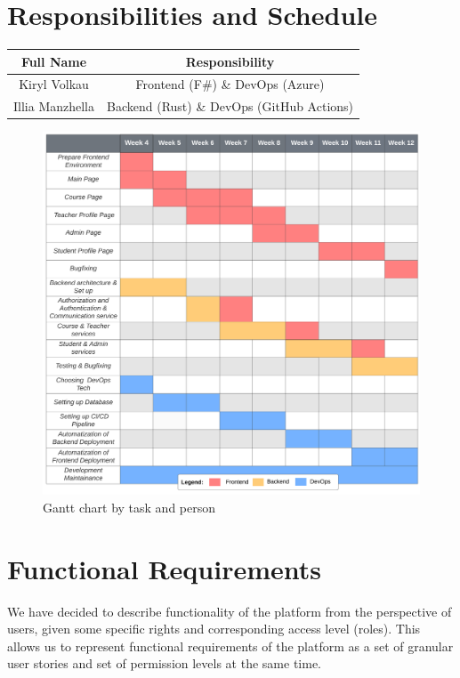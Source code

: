 \documentclass[a4paper,11pt,twoside]{report}
\theoremstyle{definition}
\begin{document}
\chapter*{Responsibilities and Schedule}
\begin{center}
\begin{tabular}{ |c|c| } 
 \hline
 Full Name & Responsibility \\ 
 \hline
 Kiryl Volkau & Frontend (F\#) \& DevOps (Azure) \\ 
 Illia Manzhella & Backend (Rust) \& DevOps (GitHub Actions) \\ 
 \hline
\end{tabular}
\begin{figure}[h]
    \includegraphics[scale=.52]{img/gantt.png}
    \caption{Gantt chart by task and person}
\end{figure}
\end{center}

\chapter*{Functional Requirements}

We have decided to describe functionality of the platform from the perspective of users, given some specific rights and corresponding access level (roles). This allows us to represent functional requirements of the platform as a set of granular user stories and set of permission levels at the same time.
\end{document}
